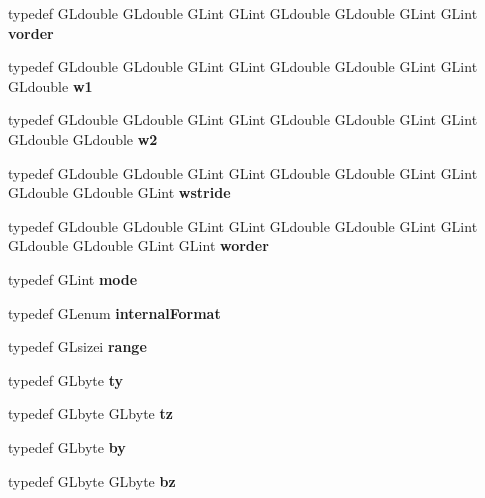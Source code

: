 \begin{DoxyCompactItemize}
\item 
typedef G\+Ldouble G\+Ldouble G\+Lint G\+Lint G\+Ldouble G\+Ldouble G\+Lint G\+Lint {\bfseries vorder}\label{_s_d_l__opengl_8h_acd4d2b309dae14d5210665bd1c47a5e3}

\item 
typedef G\+Ldouble G\+Ldouble G\+Lint G\+Lint G\+Ldouble G\+Ldouble G\+Lint G\+Lint G\+Ldouble {\bfseries w1}\label{_s_d_l__opengl_8h_ab5b747bf5adb1f9134337c30b9a4ce84}

\item 
typedef G\+Ldouble G\+Ldouble G\+Lint G\+Lint G\+Ldouble G\+Ldouble G\+Lint G\+Lint G\+Ldouble G\+Ldouble {\bfseries w2}\label{_s_d_l__opengl_8h_a1ca5aca787be24213d9591fdf074b094}

\item 
typedef G\+Ldouble G\+Ldouble G\+Lint G\+Lint G\+Ldouble G\+Ldouble G\+Lint G\+Lint G\+Ldouble G\+Ldouble G\+Lint {\bfseries wstride}\label{_s_d_l__opengl_8h_a45ed09c00679353c99521983f78a9203}

\item 
typedef G\+Ldouble G\+Ldouble G\+Lint G\+Lint G\+Ldouble G\+Ldouble G\+Lint G\+Lint G\+Ldouble G\+Ldouble G\+Lint G\+Lint {\bfseries worder}\label{_s_d_l__opengl_8h_add1fefb1be9f9351c426d1a58e7fe5f1}

\item 
typedef G\+Lint {\bfseries mode}\label{_s_d_l__opengl_8h_a1e71d9c196e4683cc06c4b54d53f7ef5}

\item 
typedef G\+Lenum {\bfseries internal\+Format}\label{_s_d_l__opengl_8h_adfa3e9c3e9fe1bf0a67a9e77a0bac5d8}

\item 
typedef G\+Lsizei {\bfseries range}\label{_s_d_l__opengl_8h_a7b8ad0b27a927682837f95528fa454f5}

\item 
typedef G\+Lbyte {\bfseries ty}\label{_s_d_l__opengl_8h_ae09063918284e24e3265a007fd1cc983}

\item 
typedef G\+Lbyte G\+Lbyte {\bfseries tz}\label{_s_d_l__opengl_8h_a0195ca51ebf5e9d2ad5665794b80d80e}

\item 
typedef G\+Lbyte {\bfseries by}\label{_s_d_l__opengl_8h_aee54e9aab2837a54be2ff5fb1c073bd2}

\item 
typedef G\+Lbyte G\+Lbyte {\bfseries bz}\label{_s_d_l__opengl_8h_a127048bfb84d994717266e27d9ae59e8}


\end{DoxyCompactItemize}
